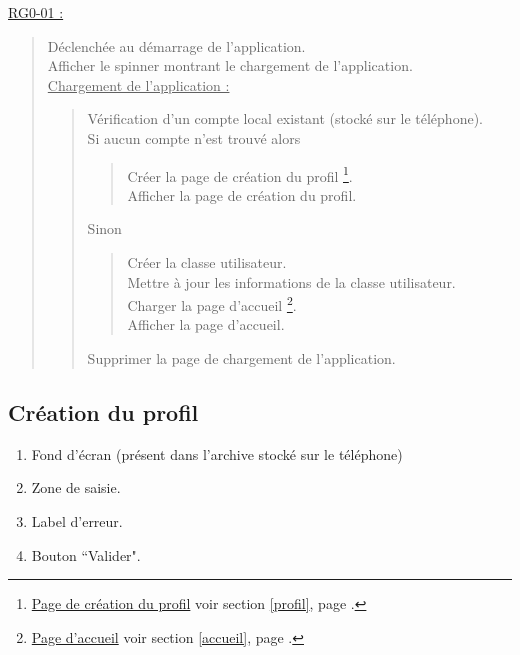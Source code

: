 \documentclass{report}
\begin{document}
		\underline{RG0-01 :}
		\begin{quote}
			Déclenchée au démarrage de l'application.\\
			Afficher le spinner montrant le chargement de l'application.\\
			\underline{Chargement de l'application :}
				\begin{quote}
					Vérification d'un compte local existant (stocké sur le téléphone).\\
					Si aucun compte n'est trouvé alors 
					\begin{quote}
						Créer la page de création du profil%
						\footnote[1]{
							\hyperlink{Création du profil}{Page de création du profil}
							\og voir section \ref{profil}, page \pageref{profil}.\fg
						}.\\
						Afficher la page de création du profil\footnotemark[1].
					\end{quote}
					Sinon
					\begin{quote}
						Créer la classe utilisateur.\\
						Mettre à jour les informations de la classe utilisateur.\\
						Charger la page d'accueil%
						\footnote[2]{
							\hyperlink{Page d'accueil}{Page d'accueil}
							\og voir section \ref{accueil}, page \pageref{accueil}.\fg
						}.\\
						Afficher la page d'accueil\footnotemark[2].
					\end{quote}
					Supprimer la page de chargement de l'application.\\
				\end{quote}
		\end{quote}

	
\newpage

	\subsection{Création du profil}
		\hypertarget{profil}{}
		\label{profil}

		\begin{center}
			
		\end{center}

		\begin{enumerate}
		  \item Fond d'écran (présent dans l'archive stocké sur le téléphone)
		  \item Zone de saisie.
		  \item Label d'erreur.
		  \item Bouton ``Valider".
		\end{enumerate}
\end{document}
